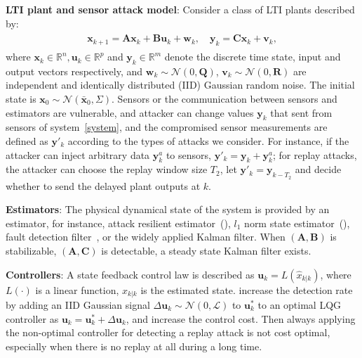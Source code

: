 \textbf{LTI plant and sensor attack model}: Consider a class of LTI plants described by: %
%
\begin{align}
\begin{split}
\mathbf{x}_{k+1}= \mathbf{Ax}_{k}+\mathbf{Bu}_{k}+\mathbf{w}_{k},\quad
\mathbf{y}_{k}= \mathbf{Cx}_{k}+\mathbf{v}_{k},
\end{split}
\label{system}
\end{align}
where $\mathbf{x}_{k} \in \mathbb{R}^{n}, \mathbf{u}_{k} \in \mathbb{R}^{p}$ and $\mathbf{y}_{k} \in \mathbb{R}^{m}$ denote the discrete time state, input and output vectors respectively, and $\mathbf{w}_{k}\sim \mathcal{N}(0,\mathbf{Q})$, $\mathbf{v}_{k}\sim  \mathcal{N}(0,\mathbf{R})$ are independent and identically distributed (IID) Gaussian random noise. The initial state is $\mathbf{x}_{0}\sim  \mathcal{N}(\bar{\mathbf{x}}_{0}, \Sigma)$. Sensors or the communication between sensors and estimators are vulnerable, and attacker can change values $\mathbf{y}_k$ that sent from sensors of system~\eqref{system}, and the compromised sensor measurements are defined as $\mathbf{y}'_k$ according to the types of attacks we consider. For instance, if the attacker can inject arbitrary data $\mathbf{y}^a_k$ to sensors, $\mathbf{y}'_k=\mathbf{y}_k+\mathbf{y}^a_k$; for replay attacks, the attacker can choose the replay window size $T_2$, let $\mathbf{y}'_{k} =\mathbf{y}_{k-T_2}$ and decide whether to send the delayed plant outputs at $k$. 

\textbf{Estimators}: %
The physical dynamical state of the system is provided by an estimator, for instance, attack resilient estimator~(\cite{res_estimator}), $l_1$ norm state estimator~(\cite{resest_cdc15}), fault detection filter~\cite{fd_filter}, or the widely applied Kalman filter.
When $(\mathbf{A},\mathbf{B})$ is stabilizable, $(\mathbf{A},\mathbf{C})$ is detectable, a steady state Kalman filter exists. 



\textbf{Controllers}: A state feedback control law is described as $\mathbf{u}_k=L(\hat{x}_{k|k})$, where $L(\cdot)$ is a linear function, $\hat{x}_{k|k}$ is the estimated state. \cite{replay} increase the detection rate by adding an IID Gaussian signal $\Delta \mathbf{u}_{k} \sim \mathcal{N}(0, \mathcal{L})$ to $\mathbf{u}_k^*$ to an optimal LQG controller as $\mathbf{u}_{k} = \mathbf{u}^{*}_{k} + \Delta \mathbf{u}_{k} \label{nlqg}$, and increase the control cost. Then always applying the non-optimal controller for detecting a replay attack is not cost optimal, especially when there is no replay at all during a long time.

